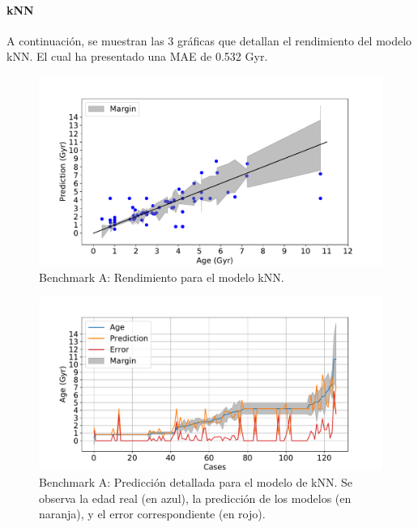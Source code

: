\paragraph{kNN} 
A continuación, se muestran las 3 gráficas que detallan el rendimiento del modelo kNN. El cual ha presentado una MAE de 0.532 Gyr.

\begin{figure}[H]
\begin{center}
 \includegraphics[width=0.8\linewidth]{Figuras/Experimentos/B_A_knn_1.pdf}
\end{center}
\caption{Benchmark A: Rendimiento para el modelo kNN.}
 \label{fig:benchA_details_knn_1}
\end{figure}

\begin{figure}[H]
\begin{center}
 \includegraphics[width=0.8\linewidth]{Figuras/Experimentos/B_A_knn_2.pdf}
\end{center}
\caption{Benchmark A: Predicción detallada para el modelo de kNN. Se observa la edad real (en azul), la predicción de los modelos (en naranja), y el error correspondiente (en rojo).}
 \label{fig:benchA_details_knn_2}
\end{figure}

